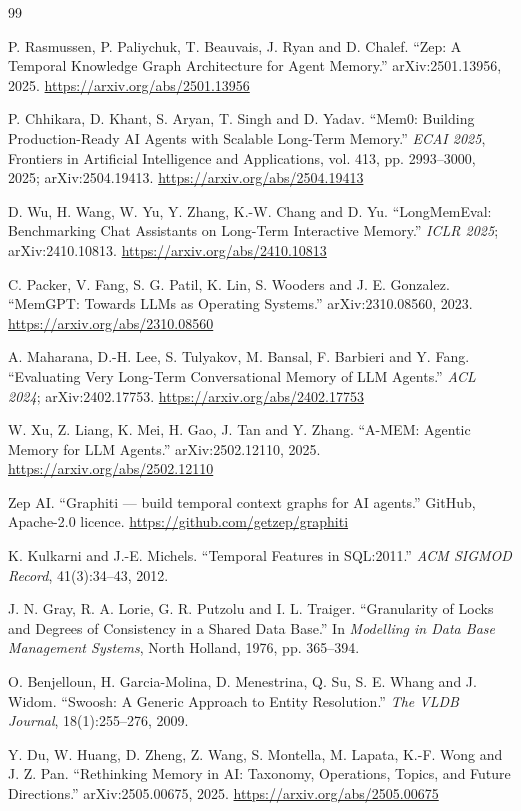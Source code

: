 \documentclass[11pt,a4paper]{article}
\begin{document}
\begin{thebibliography}{99}
{\small\raggedright\setlength{\itemsep}{0.35\baselineskip}

 P. Rasmussen, P. Paliychuk, T. Beauvais, J. Ryan and
D. Chalef. ``Zep: A Temporal Knowledge Graph Architecture for Agent
Memory.'' arXiv:2501.13956, 2025.
\url{https://arxiv.org/abs/2501.13956}

 P. Chhikara, D. Khant, S. Aryan, T. Singh and D. Yadav.
``Mem0: Building Production-Ready AI Agents with Scalable Long-Term
Memory.'' \emph{ECAI 2025}, Frontiers in Artificial Intelligence and
Applications, vol. 413, pp. 2993--3000, 2025; arXiv:2504.19413.
\url{https://arxiv.org/abs/2504.19413}

 D. Wu, H. Wang, W. Yu, Y. Zhang, K.-W. Chang and
D. Yu. ``LongMemEval: Benchmarking Chat Assistants on Long-Term
Interactive Memory.'' \emph{ICLR 2025}; arXiv:2410.10813.
\url{https://arxiv.org/abs/2410.10813}

 C. Packer, V. Fang, S. G. Patil, K. Lin, S. Wooders and
J. E. Gonzalez. ``MemGPT: Towards LLMs as Operating Systems.''
arXiv:2310.08560, 2023. \url{https://arxiv.org/abs/2310.08560}

 A. Maharana, D.-H. Lee, S. Tulyakov, M. Bansal,
F. Barbieri and Y. Fang. ``Evaluating Very Long-Term Conversational
Memory of LLM Agents.'' \emph{ACL 2024}; arXiv:2402.17753.
\url{https://arxiv.org/abs/2402.17753}

 W. Xu, Z. Liang, K. Mei, H. Gao, J. Tan and Y. Zhang.
``A-MEM: Agentic Memory for LLM Agents.'' arXiv:2502.12110, 2025.
\url{https://arxiv.org/abs/2502.12110}

 Zep AI. ``Graphiti --- build temporal context graphs
for AI agents.'' GitHub, Apache-2.0 licence.
\url{https://github.com/getzep/graphiti}

 K. Kulkarni and J.-E. Michels. ``Temporal Features in
SQL:2011.'' \emph{ACM SIGMOD Record}, 41(3):34--43, 2012.

 J. N. Gray, R. A. Lorie, G. R. Putzolu and
I. L. Traiger. ``Granularity of Locks and Degrees of Consistency in a
Shared Data Base.'' In \emph{Modelling in Data Base Management Systems},
North Holland, 1976, pp. 365--394.

 O. Benjelloun, H. Garcia-Molina, D. Menestrina, Q. Su,
S. E. Whang and J. Widom. ``Swoosh: A Generic Approach to Entity
Resolution.'' \emph{The VLDB Journal}, 18(1):255--276, 2009.

 Y. Du, W. Huang, D. Zheng, Z. Wang, S. Montella,
M. Lapata, K.-F. Wong and J. Z. Pan. ``Rethinking Memory in AI: Taxonomy,
Operations, Topics, and Future Directions.'' arXiv:2505.00675, 2025.
\url{https://arxiv.org/abs/2505.00675}
}
\end{thebibliography}
\end{document}
